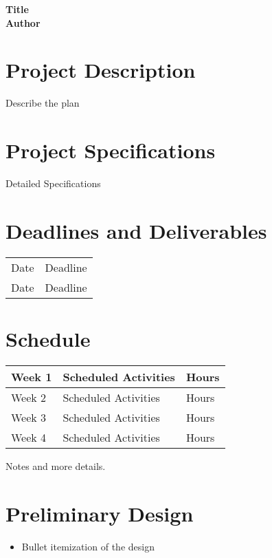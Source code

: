 \documentclass[11pt]{article}
\begin{document}
\begin{center}
	\Large \textbf{Title\\
	Author}
\end{center}
%
%
\section*{Project Description}

Describe the plan

\section*{Project Specifications}

Detailed Specifications

\section*{Deadlines and Deliverables}

\begin{tabular}{l l }
	Date & Deadline \\
	Date & Deadline \\
\end{tabular}

\section*{Schedule}

\begin{tabular}{l l l}
	Week 1 & Scheduled Activities & Hours \\
	\hline
	Week 2 & Scheduled Activities & Hours \\
	\hline
	Week 3 & Scheduled Activities & Hours \\
	\hline
	Week 4 & Scheduled Activities & Hours \\
	\hline
\end{tabular}

Notes and more details.

\section*{Preliminary Design}

\begin{itemize}
	\item Bullet itemization of the design
\end{itemize}
\end{document}
